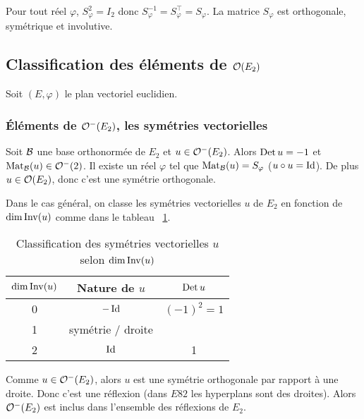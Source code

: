 \begin{corth}
  Pour tout réel \(\varphi\), \(S_\varphi^2=I_2\) donc \(S_\varphi^{-1}=S_\varphi^\top=S_\varphi\). La matrice \(S_\varphi\) est orthogonale, symétrique et involutive.
\end{corth}

\subsection{Classification des éléments de \(\mathcal{O}\!\left(E_2\right)\)}

Soit \((E,\varphi)\) le plan vectoriel euclidien.

\subsubsection{Éléments de \(\mathcal{O}^{-}\!\left(E_2\right)\), les symétries vectorielles}

Soit \(\mathcal{B}\) une base orthonormée de \(E_2\) et \(u \in \mathcal{O}^{-}\!\left(E_2\right)\). Alors \(\operatorname{Det} u=-1\) et \(\mathrm{Mat}_{\mathcal{B}}(u) \in \mathcal{O}^{-}\!\left(2\right)\). Il existe un réel \(\varphi\) tel que \(\mathrm{Mat}_{\mathcal{B}}(u)=S_\varphi\) (\(u \circ u=\operatorname{Id}\)). De plus \(u \in \mathcal{O}\!\left(E_2\right)\), donc c'est une symétrie orthogonale. 

Dans le cas général, on classe les symétries vectorielles \(u\) de \(E_2\) en fonction de \(\operatorname{dim} \operatorname{Inv}(u)\) comme dans le tableau~
\ref{tab:SymVect}.

\begin{table}[!h]
  \centering
  \begin{tabular}{|c|c|c|}\hline
    \(\operatorname{dim}\operatorname{Inv}(u)\) & Nature de \(u\) & \(\operatorname{Det} u\) \\ \hline
    0 & \(-\operatorname{Id}\) & \((-1)^2=1\) \\
    1 & symétrie / droite & \\
    2 & \(\operatorname{Id}\) & 1 \\
    \hline
  \end{tabular}
  \caption{Classification des symétries vectorielles \(u\) selon \(\operatorname{dim}\operatorname{Inv}(u)\)}
  \label{tab:SymVect}
\end{table}

Comme \(u \in \mathcal{O}^{-}\!\left(E_2\right)\), alors \(u\) est une symétrie orthogonale par rapport à une droite. Donc c'est une réflexion (dans \(E82\) les hyperplans sont des droites). Alors \(\mathcal{O}^{-}\!\left(E_2\right)\) est inclus dans l'ensemble des réflexions de \(E_2\).


